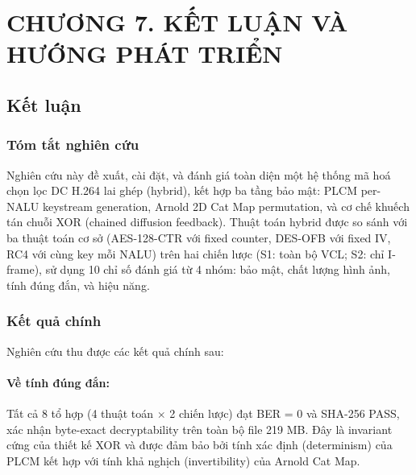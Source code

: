 \clearpage
{}
\section*{CHƯƠNG 7. KẾT LUẬN VÀ HƯỚNG PHÁT TRIỂN}
\setcounter{section}{7}
\setcounter{subsection}{0}
\setcounter{figure}{0}
\setcounter{table}{0}
\setcounter{equation}{0}

\subsection{Kết luận}

\subsubsection{Tóm tắt nghiên cứu}

Nghiên cứu này đề xuất, cài đặt, và đánh giá toàn diện một hệ thống mã hoá chọn lọc
DC H.264 lai ghép (hybrid), kết hợp ba tầng bảo mật: PLCM per-NALU keystream
generation, Arnold 2D Cat Map permutation, và cơ chế khuếch tán chuỗi XOR
(chained diffusion feedback). Thuật toán hybrid được so sánh với ba thuật toán
cơ sở (AES-128-CTR với fixed counter, DES-OFB với fixed IV, RC4 với cùng key
mỗi NALU) trên hai chiến lược (S1: toàn bộ VCL; S2: chỉ I-frame), sử dụng
10 chỉ số đánh giá từ 4 nhóm: bảo mật, chất lượng hình ảnh, tính đúng đắn, và hiệu năng.

\subsubsection{Kết quả chính}

Nghiên cứu thu được các kết quả chính sau:

\paragraph{Về tính đúng đắn:}
Tất cả 8 tổ hợp (4 thuật toán $\times$ 2 chiến lược) đạt BER = 0 và SHA-256 PASS,
xác nhận byte-exact decryptability trên toàn bộ file 219 MB. Đây là invariant cứng
của thiết kế XOR và được đảm bảo bởi tính xác định (determinism) của PLCM kết hợp
với tính khả nghịch (invertibility) của Arnold Cat Map.

